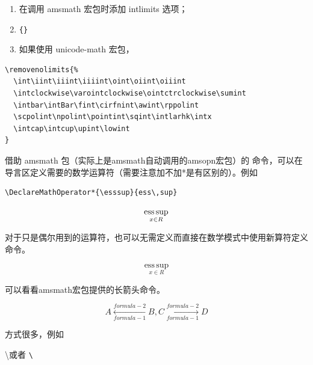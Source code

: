 \begin{enumerate}
\def\labelenumi{\arabic{enumi}.}

\item
  在调用 amsmath 宏包时添加 intlimits 选项；
\item
  \texttt{\{\}}
\item
  如果使用 unicode-math 宏包，
\end{enumerate}

\begin{verbatim}
\removenolimits{%
  \int\iint\iiint\iiiint\oint\oiint\oiiint
  \intclockwise\varointclockwise\ointctrclockwise\sumint
  \intbar\intBar\fint\cirfnint\awint\rppolint
  \scpolint\npolint\pointint\sqint\intlarhk\intx
  \intcap\intcup\upint\lowint
}
\end{verbatim}



借助 amsmath 包（实际上是amsmath自动调用的amsopn宏包）的
 命令，可以在导言区定义需要的数学运算符（需要注意加不加*是有区别的）。例如

\begin{verbatim}
\DeclareMathOperator*{\esssup}{ess\,sup}
\end{verbatim}

\begin{example}
\[ 
  \esssup_{x\in {R}} 
\]
\end{example}


对于只是偶尔用到的运算符，也可以无需定义而直接在数学模式中使用新算符定义命令。
%

\begin{example}
\[
  \operatorname*{ess\,sup}_{x\in {R}}
\]
\end{example}


可以看看amsmath宏包提供的长箭头命令。
\begin{example}
\[
  A \xleftarrow[formula-1]{formula-2} B,
  C \xrightarrow[formula-1]{formula-2} D
\]

\end{example}

方式很多，例如
\begin{example}
  \textbackslash \quad 或者 \quad \verb|\|
\end{example}
%


